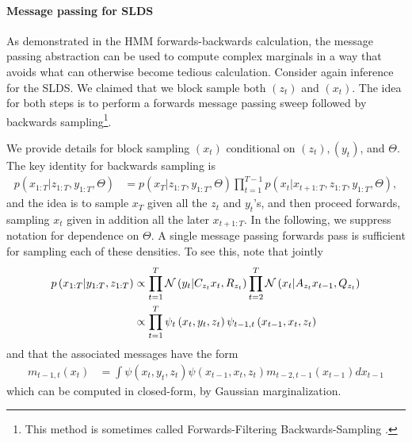 \documentclass[14pt]{extarticle}
\begin{document}

\paragraph{Message passing for SLDS}

As demonstrated in the HMM forwards-backwards calculation, the message passing
abstraction can be used to compute complex marginals in a way that avoids what
can otherwise become tedious calculation. Consider again inference for the SLDS.
We claimed that we block sample both $\left(z_t\right)$ and $\left(x_t\right)$.
The idea for both steps is to perform a forwards message passing sweep followed
by backwards sampling\footnote{This method is sometimes called
  Forwards-Filtering Backwards-Sampling \citep{carter1994gibbs}.}.

We provide details for block sampling $\left(x_t\right)$ conditional on
$\left(z_t\right), \left(y_t\right)$, and $\Theta$. The key identity for
backwards sampling is
\begin{align*}
  p\left(x_{1:T} \vert z_{1:T}, y_{1:T}, \Theta\right) &= p\left(x_{T} \vert z_{1:T}, y_{1:T}, \Theta\right) \prod_{t = 1}^{T - 1} p\left(x_{t} \vert x_{t + 1:T}, z_{1:T}, y_{1:T}, \Theta\right),
\end{align*}
and the idea is to sample $x_{T}$ given all the $z_{t}$ and $y_{t}$'s, and then
proceed forwards, sampling $x_{t}$ given in addition all the later $x_{t +
  1:T}$. In the following, we suppress notation for dependence on $\Theta$. A
single message passing forwards pass is sufficient for sampling each of these
densities. To see this, note that jointly
\begin{align*}
  p\left(x_{1:T} \vert y_{1:T}, z_{1:T}\right) &\propto
  \prod_{t = 1}^{T} \mathcal{N}\left(y_t \vert C_{z_t} x_t, R_{z_t}\right) \prod_{t = 2}^{T} \mathcal{N}\left(x_{t} \vert A_{z_t} x_{t - 1}, Q_{z_t}\right) \\
    &\propto\prod_{t = 1}^{T} \psi_{t}\left(x_{t}, y_{t}, z_{t}\right) \psi_{t - 1, t}\left(x_{t - 1}, x_{t}, z_{t}\right)
\end{align*}
and that the associated messages have the form
\begin{align*}
  m_{t - 1, t}\left(x_t\right) &= \int \psi\left(x_{t} , y_t, z_t\right)\psi\left(x_{t - 1}, x_t, z_t\right) m_{t - 2, t - 1}\left(x_{t - 1}\right) dx_{t - 1}
\end{align*}
which can be computed in closed-form, by Gaussian marginalization.
\end{document}
